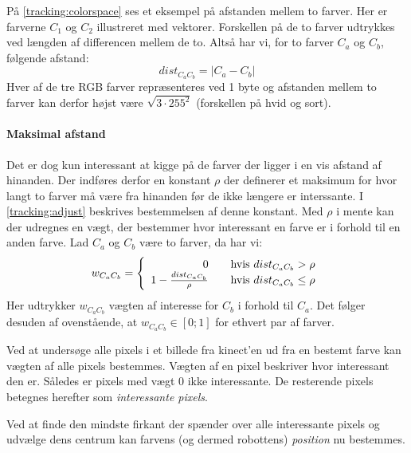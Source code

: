 På \cref{tracking:colorspace} ses et eksempel på afstanden mellem to farver.
Her er farverne $C_1$ og $C_2$ illustreret med vektorer.
Forskellen på de to farver udtrykkes ved længden af differencen mellem de to.
Altså har vi, for to farver $C_a$ og $C_b$, følgende afstand:
\begin{equation}
dist_{C_aC_b} = |C_a - C_b|
\end{equation}
Hver af de tre RGB farver repræsenteres ved 1 byte og afstanden mellem to farver kan derfor højst være $\sqrt{3 \cdot 255^2}$ (forskellen på hvid og sort).

\paragraph{Maksimal afstand}
Det er dog kun interessant at kigge på de farver der ligger i en vis afstand af hinanden.
Der indføres derfor en konstant $\rho$ der definerer et maksimum for hvor langt to farver må være fra hinanden før de ikke længere er interssante.
I \cref{tracking:adjust} beskrives bestemmelsen af denne konstant.
Med $\rho$ i mente kan der udregnes en vægt, der bestemmer hvor interessant en farve er i forhold til en anden farve.
Lad $C_a$ og $C_b$ være to farver, da har vi:
\begin{equation}
w_{C_aC_b} = \left\{ 
  \begin{array}{r l}
        0 & \quad \text{hvis $dist_{C_aC_b} > \rho$} \\
       1 - \frac{dist_{C_aC_b}}{\rho} & \quad \text{hvis $dist_{C_aC_b} \leq \rho$}
  \end{array} \right.
\end{equation}
Her udtrykker $w_{C_aC_b}$ vægten af interesse for $C_b$ i forhold til $C_a$.
Det følger desuden af ovenstående, at $w_{C_aC_b} \in [0;1]$ for ethvert par af farver.

Ved at undersøge alle pixels i et billede fra kinect'en ud fra en bestemt farve kan vægten af alle pixels bestemmes.
Vægten af en pixel beskriver hvor interessant den er.
Således er pixels med vægt 0 ikke interessante.
De resterende pixels betegnes herefter som \emph{interessante pixels}.


Ved at finde den mindste firkant der spænder over alle interessante pixels og udvælge dens centrum kan farvens (og dermed robottens) \textit{position} nu bestemmes.

